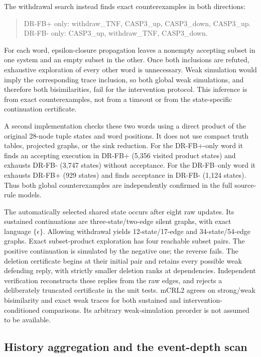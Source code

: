\documentclass{ws-jbcb}
\numberwithin{equation}{section}
\begin{document}
The withdrawal search instead finds exact counterexamples in both directions:
\begin{quote}\small
DR-FB+ only: withdraw\_TNF, CASP3\_up, CASP3\_down, CASP3\_up.\\
DR-FB- only: CASP3\_up, withdraw\_TNF, CASP3\_down.
\end{quote}
For each word, epsilon-closure propagation leaves a nonempty accepting subset
in one system and an empty subset in the other. Once both inclusions are
refuted, exhaustive exploration of every other word is unnecessary. Weak
simulation would imply the corresponding trace inclusion, so both global weak
simulations, and therefore both bisimilarities, fail for the intervention
protocol. This inference is from exact counterexamples, not from a timeout or
from the state-specific continuation certificate.

A second implementation checks these two words using a direct product of the
original 28-node tuple states and word positions. It does not use compact
truth tables, projected graphs, or the sink reduction. For the DR-FB+-only
word it finds an accepting execution in DR-FB+ (5,356 visited product states)
and exhausts DR-FB- (3,747 states) without acceptance. For the DR-FB--only word
it exhausts DR-FB+ (929 states) and finds acceptance in DR-FB- (1,124 states).
Thus both global counterexamples are independently confirmed in the full
source-rule models.

The automatically selected shared state occurs after eight raw updates. Its
sustained continuations are three-state/two-edge silent graphs, with exact
language $\{\epsilon\}$. Allowing withdrawal yields 12-state/17-edge and
34-state/54-edge graphs. Exact subset-product exploration has four reachable
subset pairs. The positive continuation is simulated by the negative one;
the reverse fails. The deletion certificate begins at their initial pair and
retains every possible weak defending reply, with strictly smaller deletion
ranks at dependencies. Independent verification reconstructs these replies
from the raw edges, and rejects a deliberately truncated certificate in the
unit tests. mCRL2 agrees on strong/weak bisimilarity and exact weak traces for
both sustained and intervention-conditioned comparisons. Its arbitrary
weak-simulation preorder is not assumed to be available.

\subsection{History aggregation and the event-depth scan}
\end{document}
